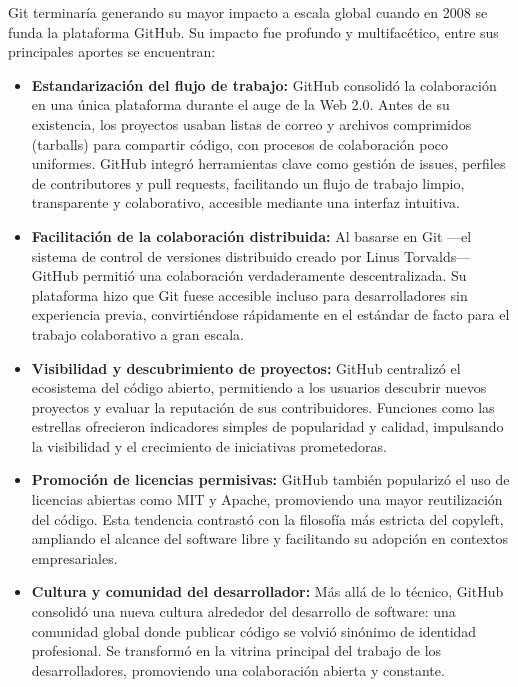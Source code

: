 \documentclass[a4paper,12pt]{article}
\begin{document}
Git terminaría generando su mayor impacto a escala global cuando en 2008 se
funda la plataforma GitHub. Su impacto fue profundo y multifacético, entre sus
principales aportes se encuentran:

\begin{itemize}
    \item \textbf{Estandarización del flujo de trabajo:} GitHub consolidó la
    colaboración en una única plataforma durante el auge de la Web 2.0. Antes de
    su existencia, los proyectos usaban listas de correo y archivos comprimidos
    (tarballs) para compartir código, con procesos de colaboración poco
    uniformes. GitHub integró herramientas clave como gestión de issues,
    perfiles de contributores y pull requests, facilitando un flujo de trabajo
    limpio, transparente y colaborativo, accesible mediante una interfaz
    intuitiva.

    \item \textbf{Facilitación de la colaboración distribuida:} Al basarse en
    Git —el sistema de control de versiones distribuido creado por Linus
    Torvalds— GitHub permitió una colaboración verdaderamente descentralizada.
    Su plataforma hizo que Git fuese accesible incluso para desarrolladores sin
    experiencia previa, convirtiéndose rápidamente en el estándar de facto para
    el trabajo colaborativo a gran escala.

    \item \textbf{Visibilidad y descubrimiento de proyectos:} GitHub centralizó
    el ecosistema del código abierto, permitiendo a los usuarios descubrir
    nuevos proyectos y evaluar la reputación de sus contribuidores. Funciones
    como las estrellas ofrecieron indicadores simples de popularidad y calidad,
    impulsando la visibilidad y el crecimiento de iniciativas prometedoras.

    \item \textbf{Promoción de licencias permisivas:} GitHub también popularizó
    el uso de licencias abiertas como MIT y Apache, promoviendo una mayor
    reutilización del código. Esta tendencia contrastó con la filosofía más
    estricta del copyleft, ampliando el alcance del software libre y facilitando
    su adopción en contextos empresariales.

    \item \textbf{Cultura y comunidad del desarrollador:} Más allá de lo
    técnico, GitHub consolidó una nueva cultura alrededor del desarrollo de
    software: una comunidad global donde publicar código se volvió sinónimo de
    identidad profesional. Se transformó en la vitrina principal del trabajo de
    los desarrolladores, promoviendo una colaboración abierta y constante.
\end{itemize}
\end{document}
